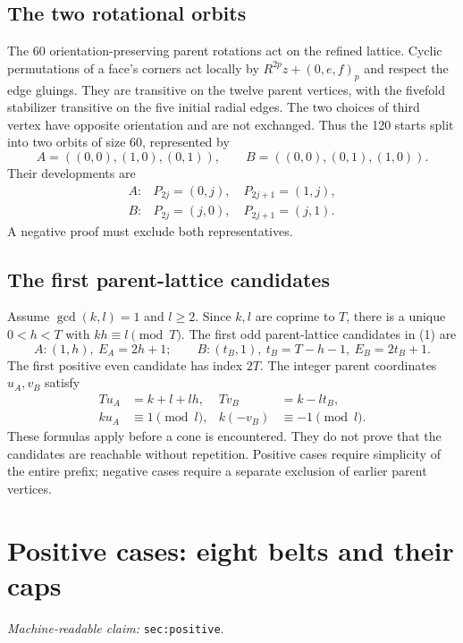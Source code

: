 \documentclass[11pt]{amsart}
\newcommand{\record}[1]{\nolinkurl{#1}}
\newcommand{\claimid}[1]{\par\nopagebreak\noindent\textit{Machine-readable claim:} \record{#1}.\par}
\begin{document}
\subsection{The two rotational orbits}
The 60 orientation-preserving parent rotations act on the refined
lattice. Cyclic permutations of a face's corners act locally by
$R^{2p}z+(0,e,f)_p$ and respect the edge gluings. They are transitive
on the twelve parent vertices, with the fivefold stabilizer transitive
on the five initial radial edges. The two choices of third vertex have
opposite orientation and are not exchanged. Thus the 120 starts split
into two orbits of size 60, represented by
\[
 A=((0,0),(1,0),(0,1)),\qquad B=((0,0),(0,1),(1,0)).
\]
Their developments are
\begin{equation}\label{eq:3}
\begin{array}{ll}
 A: & P_{2j}=(0,j),\quad P_{2j+1}=(1,j),\\
 B: & P_{2j}=(j,0),\quad P_{2j+1}=(j,1).
\end{array}\tag{3}
\end{equation}
A negative proof must
exclude both representatives.

\subsection{The first parent-lattice candidates}
Assume $\gcd(k,l)=1$ and $l\ge2$. Since $k,l$ are coprime to $T$,
there is a unique $0<h<T$ with $kh\equiv l\pmod T$. The first odd
parent-lattice candidates in (1) are
\begin{equation}\label{eq:4}
 A:(1,h),\ E_A=2h+1;\qquad
 B:(t_B,1),\ t_B=T-h-1,\ E_B=2t_B+1.\tag{4}
\end{equation}
The first positive even candidate has index $2T$. The integer parent
coordinates $u_A,v_B$ satisfy
\begin{equation}\label{eq:5}
\begin{aligned}
 Tu_A&=k+l+lh,& Tv_B&=k-lt_B,\\
 ku_A&\equiv1\pmod l,& k(-v_B)&\equiv-1\pmod l.
\end{aligned}\tag{5}
\end{equation}
These formulas apply before a cone is encountered. They do not prove
that the candidates are reachable without repetition. Positive cases
require simplicity of the entire prefix; negative cases require a
separate exclusion of earlier parent vertices.

\section{Positive cases: eight belts and their caps}\label{sec:positive}
\claimid{sec:positive}
\end{document}
